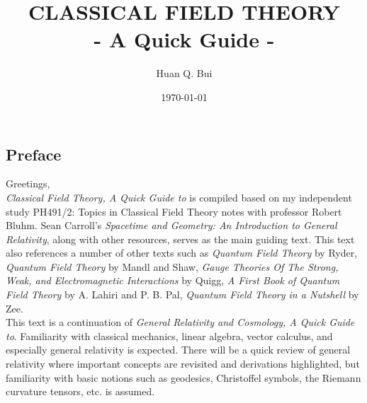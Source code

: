\documentclass{book}
\numberwithin{equation}{section}
\theoremstyle{definition}
\begin{document}
\begin{titlepage}\centering
 \clearpage
 \title{\textsc{\bf{CLASSICAL FIELD THEORY}}\\\smallskip - A Quick Guide -\\}
 \author{\bigskip Huan Q. Bui}
 \date{\today}
 \maketitle
 \thispagestyle{empty}
\end{titlepage}

\newpage

\subsection*{Preface}

Greetings,\\

\textit{Classical Field Theory, A Quick Guide to} is compiled based on my independent study PH491/2: Topics in Classical Field Theory notes with professor Robert Bluhm. Sean Carroll's \textit{Spacetime and Geometry: An Introduction to General Relativity}, along with other resources, serves as the main guiding text. This text also references a number of other texts such as \textit{Quantum Field Theory} by Ryder, \textit{Quantum Field Theory} by Mandl and Shaw, \textit{Gauge Theories Of The Strong, Weak, and Electromagnetic Interactions} by Quigg, \textit{A First Book of Quantum Field Theory} by A. Lahiri and P. B. Pal, \textit{Quantum Field Theory in a Nutshell} by Zee.   \\

This text is a continuation of \textit{General Relativity and Cosmology, A Quick Guide to}. Familiarity with classical mechanics, linear algebra, vector calculus, and especially general relativity is expected. There will be a quick review of general relativity where important concepts are revisited and derivations highlighted, but familiarity with basic notions such as geodesics, Christoffel symbols, the Riemann curvature tensors, etc. is assumed. \\ 
\end{document}
